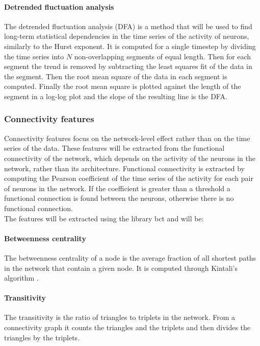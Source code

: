       \paragraph{Detrended fluctuation analysis}
      \label{sec:dfa}
      The detrended fluctuation analysis (DFA) is a method that will be used to find long-term statistical dependencies in the time series of the activity of neurons, similarly to the Hurst exponent.
      It is computed for a single timestep by dividing the time series into $N$ non-overlapping segments of equal length.
      Then for each segment the trend is removed by subtracting the least squares fit of the data in the segment.
      Then the root mean square of the data in each segment is computed.
      Finally the root mean square is plotted against the length of the segment in a log-log plot and the slope of the resulting line is the DFA.

    \subsubsection{Connectivity features}
    Connectivity features focus on the network-level effect rather than on the time series of the data.
    These features will be extracted from the functional connectivity of the network, which depends on the activity of the neurons in the network, rather than its architecture.
    Functional connectivity is extracted by computing the Pearson coefficient of the time series of the activity for each pair of neurons in the network.
    If the coefficient is greater than a threshold a functional connection is found between the neurons, otherwise there is no functional connection.\\
    The features will be extracted using the library bct \cite{bct} and will be:


      \paragraph{Betweenness centrality}
      \label{sec:betweenness}
      The betweenness centrality of a node is the average fraction of all shortest paths in the network that contain a given node.
      It is computed through Kintali's algorithm \cite{betweenness}.

      \paragraph{Transitivity}
      \label{sec:transitivity}
      The transitivity  is the ratio of triangles to triplets in the network.
      From a connectivity graph it counts the triangles and the triplets and then divides the triangles by the triplets.

